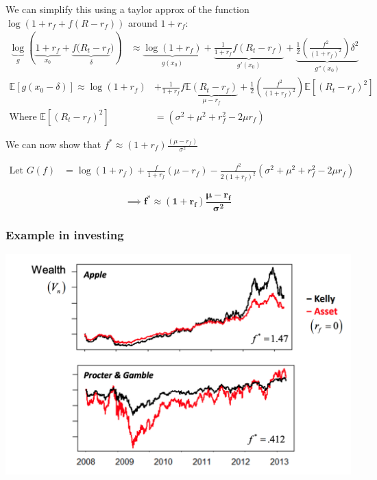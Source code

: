 \documentclass[
  oneside]{book}
\begin{document}
We can simplify this using a taylor approx of the function \(\log(1+r_{f}+f(R-r_{f}))\) around \(1+r_{f}\):
\[
\begin{aligned}
\underbrace{ \log }_{ g } \left( \underbrace{ 1+r_{f} }_{ x_{0} }+\underbrace{ f(R_{t}-r_{f} }_{ \delta }) \right) &\approx \underbrace{ \log(1+r_{f}) }_{ g(x_{0}) } + \underbrace{ \frac{1}{1+r_{f}}f(R_{t}-r_{f}) }_{ g'(x_{0}) }+\underbrace{ \frac{1}{2}\left( \frac{f^{2}}{(1+r_{f})^{2}}\right)\delta^{2} }_{ g''(x_{0}) }
\end{aligned}
\]
\[
\begin{aligned}
\mathbb{E}[g(x_{0}-\delta)] \approx \log(1+r_{f}) &+ \frac{1}{1+r_{f}}f\underbrace{ \mathbb{E}(R_{t}-r_{f}) }_{ \mu-r_{f} }+\frac{1}{2}\left( \frac{f^{2}}{(1+r_{f})^{2}}\right)\mathbb{E}[(R_{t}-r_{f})^{2}]\\
\text{Where } \mathbb{E}[(R_{t}-r_{f})^{2}] &= (\sigma^{2}+\mu^{2}+r_{f}^{2}-2\mu r_{f})
\end{aligned}
\]

We can now show that \(f^{*} \approx (1+r_{f}) \frac{(\mu-r_{f})}{\sigma^{2}}\)

\[
\begin{aligned}
\text{Let } G(f) &= \log(1+r_{f})+\frac{f}{1+r_{f}}(\mu-r_{f})-\frac{f^{2}}{2(1+r_{f})^{2}}(\sigma^{2}+\mu^{2}+r_{f}^{2}-2\mu r_{f})
\end{aligned}
\]

\[
\mathbf{\implies f^{*} \approx (1+r_{f}) \frac{\mu-r_{f}}{\sigma^{2}}}
\]

\hypertarget{example-in-investing}{%
\subsubsection{Example in investing}\label{example-in-investing}}

\includegraphics{Notes/Obsidian-Attachments/8-Betting-Strategies-2.png}
\end{document}
